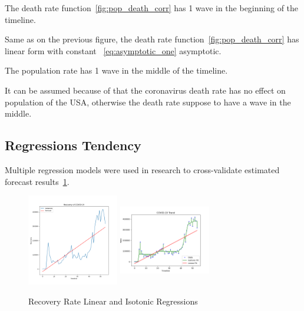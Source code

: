 The death rate function~\ref{fig:pop_death_corr} has 1 wave in the beginning of the timeline.

Same as on the previous figure, the death rate function~\ref{fig:pop_death_corr}  has linear form with constant ~\ref{eq:asymptotic_one} asymptotic.

The population rate has 1 wave in the middle of the timeline.

It can be assumed because of that the coronavirus death rate has no effect on population of the USA, otherwise the death rate suppose to have a wave in the middle.





\subsection{Regressions Tendency}
\label{subsec:regressions-tendency}


Multiple regression models were used in research to cross-validate estimated forecast results~\ref{fig:recovery_regressions}.

\begin{figure}[h]
    \includegraphics*[width=4cm, height=4cm]{../src/output/recovery-linear-regression.png}
    \includegraphics*[width=4cm, height=4cm]{../src/output/recovery_isotonic_regression.png}
    \caption{Recovery Rate Linear and Isotonic Regressions}
    \label{fig:recovery_regressions}
\end{figure}

